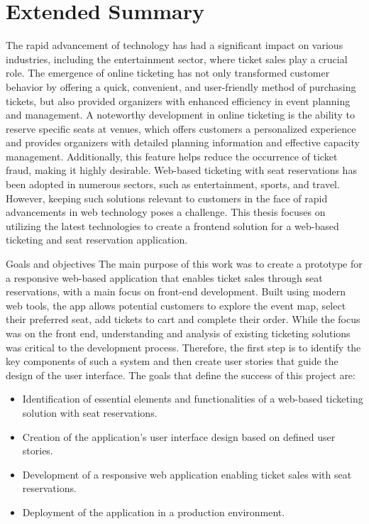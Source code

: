 \chapter{Extended Summary}
\label{ch:extended-summary}
The rapid advancement of technology has had a significant impact on various industries, including the entertainment sector, where ticket sales play a crucial role.
The emergence of online ticketing has not only transformed customer behavior by offering a quick, convenient, and user-friendly method of purchasing tickets, but also provided organizers with enhanced efficiency in event planning and management.
A noteworthy development in online ticketing is the ability to reserve specific seats at venues, which offers customers a personalized experience and provides organizers with detailed planning information and effective capacity management.
Additionally, this feature helps reduce the occurrence of ticket fraud, making it highly desirable.
Web-based ticketing with seat reservations has been adopted in numerous sectors, such as entertainment, sports, and travel.
However, keeping such solutions relevant to customers in the face of rapid advancements in web technology poses a challenge.
This thesis focuses on utilizing the latest technologies to create a frontend solution for a web-based ticketing and seat reservation application.

\begin{section}{Goals and objectives}
    \label{sec:goals-and-objectives}
    The main purpose of this work was to create a prototype for a responsive web-based application that enables ticket sales through seat reservations, with a main focus on front-end development.
    Built using modern web tools, the app allows potential customers to explore the event map, select their preferred seat, add tickets to cart and complete their order.
    While the focus was on the front end, understanding and analysis of existing ticketing solutions was critical to the development process.
    Therefore, the first step is to identify the key components of such a system and then create user stories that guide the design of the user interface.
    The goals that define the success of this project are:

    \begin{itemize}
        \item Identification of essential elements and functionalities of a web-based ticketing solution with seat reservations.
        \item Creation of the application's user interface design based on defined user stories.
        \item Development of a responsive web application enabling ticket sales with seat reservations.
        \item Deployment of the application in a production environment.
    \end{itemize}
\end{section}

